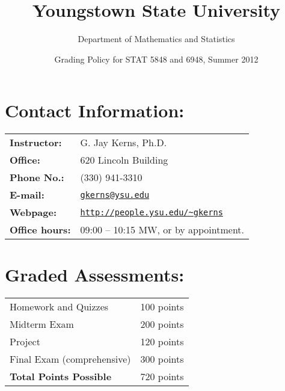 \documentclass[11pt]{article}
\title{Youngstown State University}
\author{Department of Mathematics and Statistics}
\date{Grading Policy for STAT 5848 and 6948, Summer 2012}
\begin{document}
\maketitle

\thispagestyle{empty}

\section*{Contact Information:}
\label{sec-1}


\begin{center}
\begin{tabular}{l|l}
\hline
 \textbf{Instructor:}    &  G. Jay Kerns, Ph.D.                                                                             \\
 \textbf{Office:}        &  620 Lincoln Building                                                                            \\
 \textbf{Phone No.:}     &  (330) 941-3310                                                                                  \\
 \textbf{E-mail:}        &  \href{mailto:gkerns@ysu.edu}{ \texttt{gkerns@ysu.edu} }                                         \\
 \textbf{Webpage:}       &  \href{http://people.ysu.edu/~gkerns}{ \texttt{http://people.ysu.edu/\textasciitilde{}gkerns} }  \\
 \textbf{Office hours:}  &  09:00 – 10:15 MW, or by appointment.                                                            \\
\hline
\end{tabular}
\end{center}
\section*{Graded Assessments:}
\label{sec-2}


\begin{center}
\begin{tabular}{l|l}
\hline
 Homework and Quizzes            &  100 points  \\
 Midterm Exam                    &  200 points  \\
 Project                         &  120 points  \\
 Final Exam (comprehensive)      &  300 points  \\
\hline
 \textbf{Total Points Possible}  &  720 points  \\
\hline
\end{tabular}
\end{center}
\end{document}
